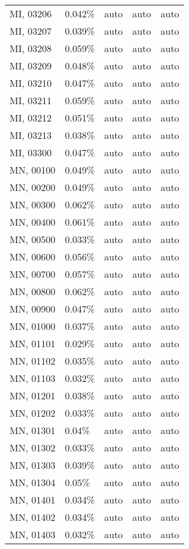 \begin{longtable}[]{@{}lllll@{}}
MI, 03206 & 0.042\% & auto & auto & auto \\
MI, 03207 & 0.039\% & auto & auto & auto \\
MI, 03208 & 0.059\% & auto & auto & auto \\
MI, 03209 & 0.048\% & auto & auto & auto \\
MI, 03210 & 0.047\% & auto & auto & auto \\
MI, 03211 & 0.059\% & auto & auto & auto \\
MI, 03212 & 0.051\% & auto & auto & auto \\
MI, 03213 & 0.038\% & auto & auto & auto \\
MI, 03300 & 0.047\% & auto & auto & auto \\
MN, 00100 & 0.049\% & auto & auto & auto \\
MN, 00200 & 0.049\% & auto & auto & auto \\
MN, 00300 & 0.062\% & auto & auto & auto \\
MN, 00400 & 0.061\% & auto & auto & auto \\
MN, 00500 & 0.033\% & auto & auto & auto \\
MN, 00600 & 0.056\% & auto & auto & auto \\
MN, 00700 & 0.057\% & auto & auto & auto \\
MN, 00800 & 0.062\% & auto & auto & auto \\
MN, 00900 & 0.047\% & auto & auto & auto \\
MN, 01000 & 0.037\% & auto & auto & auto \\
MN, 01101 & 0.029\% & auto & auto & auto \\
MN, 01102 & 0.035\% & auto & auto & auto \\
MN, 01103 & 0.032\% & auto & auto & auto \\
MN, 01201 & 0.038\% & auto & auto & auto \\
MN, 01202 & 0.033\% & auto & auto & auto \\
MN, 01301 & 0.04\% & auto & auto & auto \\
MN, 01302 & 0.033\% & auto & auto & auto \\
MN, 01303 & 0.039\% & auto & auto & auto \\
MN, 01304 & 0.05\% & auto & auto & auto \\
MN, 01401 & 0.034\% & auto & auto & auto \\
MN, 01402 & 0.034\% & auto & auto & auto \\
MN, 01403 & 0.032\% & auto & auto & auto \\

\end{longtable}
